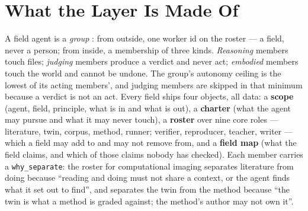 \documentclass[11pt]{article}
\theoremstyle{definition}
\begin{document}
\section{What the Layer Is Made Of}\label{sec:made}

A field agent is a \emph{group} \citep{yang2026library}: from outside, one worker id on the roster --- a field, never a person; from inside, a membership of three kinds. \emph{Reasoning} members touch files; \emph{judging} members produce a verdict and never act; \emph{embodied} members touch the world and cannot be undone. The group's autonomy ceiling is the lowest of its acting members', and judging members are skipped in that minimum because a verdict is not an act. Every field ships four objects, all data: a \textbf{scope} (agent, field, principle, what is in and what is out), a \textbf{charter} (what the agent may pursue and what it may never touch), a \textbf{roster} over nine core roles --- literature, twin, corpus, method, runner; verifier, reproducer, teacher, writer --- which a field may add to and may not remove from, and a \textbf{field map} (what the field claims, and which of those claims nobody has checked). Each member carries a \texttt{why\_separate}: the roster for computational imaging separates literature from doing because ``reading and doing must not share a context, or the agent finds what it set out to find'', and separates the twin from the method because ``the twin is what a method is graded against; the method's author may not own it''.
\end{document}

